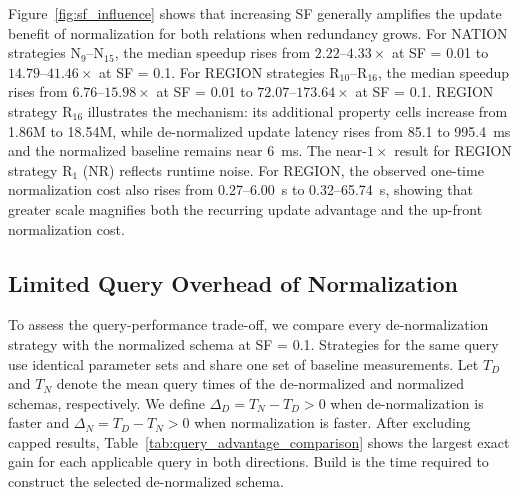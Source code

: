 \documentclass[sigconf]{acmart}
\begin{document}
Figure~\ref{fig:sf_influence} shows that increasing SF generally amplifies the update benefit of normalization for both relations when redundancy grows. For NATION strategies $\mathrm{N}_9$--$\mathrm{N}_{15}$, the median speedup rises from $2.22$--$4.33\times$ at SF = 0.01 to $14.79$--$41.46\times$ at SF = 0.1. For REGION strategies $\mathrm{R}_{10}$--$\mathrm{R}_{16}$, the median speedup rises from $6.76$--$15.98\times$ at SF = 0.01 to $72.07$--$173.64\times$ at SF = 0.1. REGION strategy $\mathrm{R}_{16}$ illustrates the mechanism: its additional property cells increase from 1.86M to 18.54M, while de-normalized update latency rises from 85.1 to 995.4~ms and the normalized baseline remains near 6~ms. The near-$1\times$ result for REGION strategy $\mathrm{R}_1$ (NR) reflects runtime noise. For REGION, the observed one-time normalization cost also rises from 0.27--6.00~s to 0.32--65.74~s, showing that greater scale magnifies both the recurring update advantage and the up-front normalization cost.



\subsection{Limited Query Overhead of Normalization}

To assess the query-performance trade-off, we compare every de-normalization strategy with the normalized schema at SF = 0.1. Strategies for the same query use identical parameter sets and share one set of baseline measurements. Let $T_D$ and $T_N$ denote the mean query times of the de-normalized and normalized schemas, respectively. We define $\Delta_D=T_N-T_D>0$ when de-normalization is faster and $\Delta_N=T_D-T_N>0$ when normalization is faster. After excluding capped results, Table~\ref{tab:query_advantage_comparison} shows the largest exact gain for each applicable query in both directions. Build is the time required to construct the selected de-normalized schema.
\end{document}
